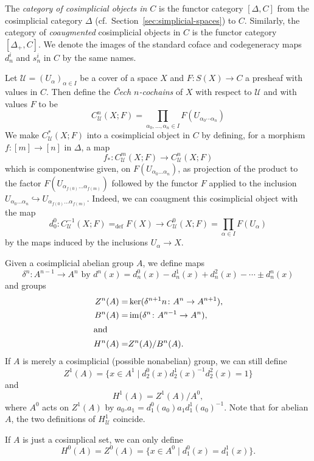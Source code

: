 \documentclass[a4paper,openany]{scrbook}
\newcommand{\nerve}{\mathcal N}
\begin{document}

\begin{defn}
The \emph{category of cosimplicial objects in $C$} is the functor category $[\Delta,C]$ from the cosimplicial category $\Delta$ (cf.~Section~\ref{sec:simplicial-spaces}) to $C$. Similarly, the category of \emph{coaugmented} cosimplicial objects in $C$ is the functor category $[\Delta_+,C]$. We denote the images of the standard coface and codegeneracy maps $d^i_n$ and $s^i_n$ in $C$ by the same names.
\end{defn}

\begin{defn}
Let $\mathcal U=(U_\alpha)_{\alpha \in I}$ be a cover of a space $X$ and $F\colon S(X) \to C$ a presheaf with values in $C$. Then define the \emph{Čech $n$-cochains} of $X$ with respect to $\mathcal U$ and with values $F$ to be
\[
C^n_{\mathcal U}(X;F) =  \prod_{\alpha_0,\dots,\alpha_n \in I} F(U_{\alpha_0\cdots\alpha_n})
\]
We make $C^*_{\mathcal U}(X;F)$ into a cosimplicial object in $C$ by defining, for a morphism $f\colon [m] \to [n]$ in $\Delta$, a map
\[
f_*\colon C^m_{\mathcal U}(X;F) \to C^n_{\mathcal U}(X;F)
\]
which is componentwise given, on $F(U_{\alpha_0\dots\alpha_n})$, as projection of the product to the factor $F(U_{\alpha_{f(0)}\dots \alpha_{f(m)}})$ followed by the functor $F$ applied to the inclusion $U_{\alpha_0\dots\alpha_n} \hookrightarrow U_{\alpha_{f(0)}\dots \alpha_{f(m)}}$. Indeed, we can coaugment this cosimplicial object with the map
\[
d_0^0\colon C^{-1}_{\mathcal U}(X;F) =_{\operatorname{def}} F(X) \to C^0_{\mathcal U}(X;F) = \prod_{\alpha \in I} F(U_\alpha)
\]
by the maps induced by the inclusions $U_\alpha \to X$.
\end{defn}



\begin{defn}
Given a cosimplicial abelian group $A$, we define maps
\[
\delta^n\colon A^{n-1} \to A^{n} \text{ by } d^n(x) = d^0_{n}(x)-d^1_{n}(x)+d^2_{n}(x)-\cdots\pm d^{n}_{n}(x)
\]
and groups
\begin{align*}
Z^n(A) =& \ker(\delta^{n+1}n\colon A^n \to A^{n+1}),\\
B^n(A) =& \operatorname{im}(\delta^{n}\colon A^{n-1} \to A^{n}),\\
\intertext{and}
H^n(A) =& Z^n(A)/B^n(A).
\end{align*}
If $A$ is merely a cosimplicial (possible nonabelian) group, we can still define
\[
Z^1(A) = \{x \in A^1 \mid d^0_2(x)d^1_2(x)^{-1}d^2_2(x)=1\}
\]
and
\[
H^1(A) = Z^1(A)/A^0,
\]
where $A^0$ acts on $Z^1(A)$ by $a_0.a_1 = d^0_1(a_0) a_1 d^1_1(a_0)^{-1}$. Note that for abelian $A$, the two definitions of $H^1_{\mathcal U}$ coincide.

If $A$ is just a cosimplical set, we can only define
\[
H^0(A) = Z^0(A) = \{x \in A^0 \mid d^0_1(x) = d^1_1(x)\}.
\]
\end{defn}
\end{document}
